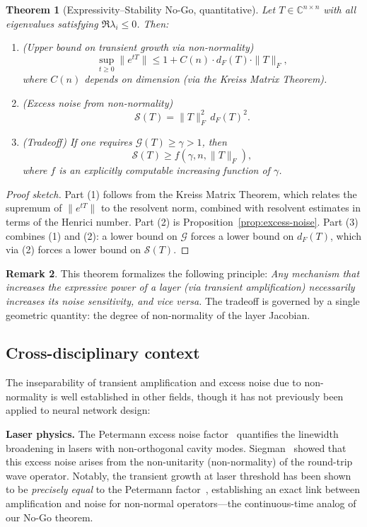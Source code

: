 \documentclass[11pt,a4paper]{article}
\newtheorem{theorem}{Theorem}[section]
\theoremstyle{definition}
\newtheorem{remark}[theorem]{Remark}
\begin{document}
\begin{theorem}[Expressivity--Stability No-Go, quantitative]
\label{thm:nogo-quant}
Let $T \in \mathbb{C}^{n \times n}$ with all eigenvalues satisfying
$\Re\lambda_i \leq 0$. Then:
\begin{enumerate}[nosep]
  \item (Upper bound on transient growth via non-normality)
  \[
    \sup_{t \geq 0} \|e^{tT}\| \leq 1 + C(n) \cdot d_F(T) \cdot \|T\|_F,
  \]
  where $C(n)$ depends on dimension (via the Kreiss Matrix Theorem).
  \item (Excess noise from non-normality)
  \[
    \mathcal{S}(T) = \|T\|_F^2 \, d_F(T)^2.
  \]
  \item (Tradeoff) If one requires $\mathcal{G}(T) \geq \gamma > 1$, then
  \[
    \mathcal{S}(T) \geq f(\gamma, n, \|T\|_F),
  \]
  where $f$ is an explicitly computable increasing function of $\gamma$.
\end{enumerate}
\end{theorem}

\begin{proof}[Proof sketch]
Part (1) follows from the Kreiss Matrix Theorem, which relates the supremum
of $\|e^{tT}\|$ to the resolvent norm, combined with resolvent estimates in
terms of the Henrici number. Part (2) is Proposition~\ref{prop:excess-noise}.
Part (3) combines (1) and (2): a lower bound on $\mathcal{G}$ forces a
lower bound on $d_F(T)$, which via (2) forces a lower bound on $\mathcal{S}(T)$.
\end{proof}

\begin{remark}
This theorem formalizes the following principle:
\emph{Any mechanism that increases the expressive power of a layer
(via transient amplification) necessarily increases its noise sensitivity,
and vice versa.} The tradeoff is governed by a single geometric quantity:
the degree of non-normality of the layer Jacobian.
\end{remark}

\subsection{Cross-disciplinary context}

The inseparability of transient amplification and excess noise due to
non-normality is well established in other fields, though it has not
previously been applied to neural network design:

\textbf{Laser physics.}
The Petermann excess noise factor~\cite{petermann1979} quantifies the
linewidth broadening in lasers with non-orthogonal cavity modes.
Siegman~\cite{siegman1989a,siegman1989b} showed that this excess noise
arises from the non-unitarity (non-normality) of the round-trip wave
operator. Notably, the transient growth at laser threshold has been
shown to be \emph{precisely equal} to the Petermann factor~\cite{berry2003},
establishing an exact link between amplification and noise for
non-normal operators---the continuous-time analog of our No-Go theorem.
\end{document}
